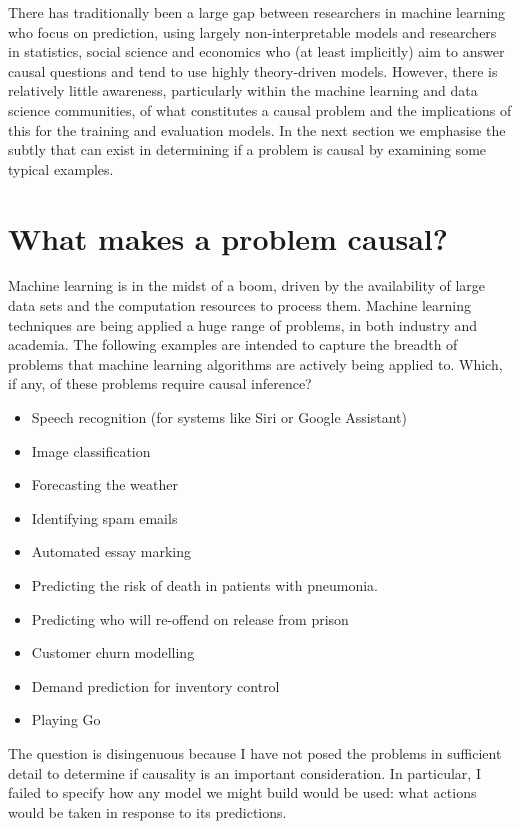 \documentclass[11pt,a4paper,twoside]{report}
\theoremstyle{plain}
\theoremstyle{definition}
\begin{document}
There has traditionally been a large gap between researchers in machine learning who focus on prediction, using largely non-interpretable models and researchers in statistics, social science and economics who (at least implicitly) aim to answer causal questions and tend to use highly theory-driven models. However, there is relatively little awareness, particularly within the machine learning and data science communities, of what constitutes a causal problem and the implications of this for the training and evaluation models. In the next section we emphasise the subtly that can exist in determining if a problem is causal by examining some typical examples. 

\section{What makes a problem causal?}

Machine learning is in the midst of a boom, driven by the availability of large data sets and the computation resources to process them. Machine learning techniques are being applied a huge range of problems, in both industry and academia. The following examples are intended to capture the breadth of problems that machine learning algorithms are actively being applied to. Which, if any, of these problems require causal inference? 

\begin{itemize}
\item Speech recognition (for systems like Siri or Google Assistant)
\item Image classification
\item Forecasting the weather
\item Identifying spam emails
\item Automated essay marking
\item Predicting the risk of death in patients with pneumonia.
\item Predicting who will re-offend on release from prison 
\item Customer churn modelling
\item Demand prediction for inventory control
\item Playing Go 
\end{itemize}

The question is disingenuous because I have not posed the problems in sufficient detail to determine if causality is an important consideration. In particular, I failed to specify how any model we might build would be used: what actions would be taken in response to its predictions. 
\end{document}
